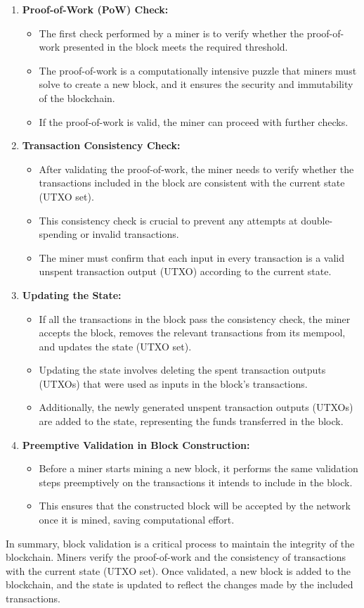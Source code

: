 \begin{enumerate}
	\item \textbf{Proof-of-Work (PoW) Check:}
	\begin{itemize}
		\item The first check performed by a miner is to verify whether the proof-of-work presented in the block meets the required threshold.
		\item The proof-of-work is a computationally intensive puzzle that miners must solve to create a new block, and it ensures the security and immutability of the blockchain.
		\item If the proof-of-work is valid, the miner can proceed with further checks.
	\end{itemize}
	\item \textbf{Transaction Consistency Check:}
	\begin{itemize}
		\item After validating the proof-of-work, the miner needs to verify whether the transactions included in the block are consistent with the current state (UTXO set).
		\item This consistency check is crucial to prevent any attempts at double-spending or invalid transactions.
		\item The miner must confirm that each input in every transaction is a valid unspent transaction output (UTXO) according to the current state.
	\end{itemize}
	\item \textbf{Updating the State:}
	\begin{itemize}
		\item If all the transactions in the block pass the consistency check, the miner accepts the block, removes the relevant transactions from its mempool, and updates the state (UTXO set).
		\item Updating the state involves deleting the spent transaction outputs (UTXOs) that were used as inputs in the block's transactions.
		\item Additionally, the newly generated unspent transaction outputs (UTXOs) are added to the state, representing the funds transferred in the block.
	\end{itemize}
	\item \textbf{Preemptive Validation in Block Construction:}
	\begin{itemize}
		\item Before a miner starts mining a new block, it performs the same validation steps preemptively on the transactions it intends to include in the block.
		\item This ensures that the constructed block will be accepted by the network once it is mined, saving computational effort.
	\end{itemize}
\end{enumerate}
In summary, block validation is a critical process to maintain the integrity of the blockchain. Miners verify the proof-of-work and the consistency of transactions with the current state (UTXO set). Once validated, a new block is added to the blockchain, and the state is updated to reflect the changes made by the included transactions.
